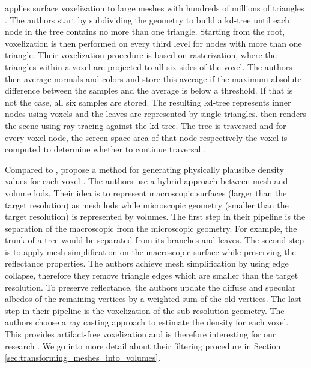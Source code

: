 \citeauthor{afra_voxel_lods} applies surface voxelization to large meshes with hundreds of millions of triangles \cite{afra_voxel_lods}.
The authors start by subdividing the geometry to build a kd-tree until each node in the tree contains no more than one triangle.
Starting from the root, voxelization is then performed on every third level for nodes with more than one triangle.
Their voxelization procedure is based on rasterization, where the triangles within a voxel are projected to all six sides of the voxel.
The authors then average normals and colors and store this average if the maximum absolute difference between the samples and the average is below a threshold.
If that is not the case, all six samples are stored.
The resulting kd-tree represents inner nodes using voxels and the leaves are represented by single triangles.
\citeauthor{afra_voxel_lods} then renders the scene using ray tracing against the kd-tree.
The tree is traversed and for every voxel node, the screen space area of that node respectively the voxel is computed to determine whether to continue traversal \cite{afra_voxel_lods}.

Compared to \citeauthor{afra_voxel_lods}, \citeauthor{hybrid_mesh_volume_lods} propose a method for generating physically plausible density values for each voxel \cite{hybrid_mesh_volume_lods}.
The authors use a hybrid approach between mesh and volume \acp{lod}.
Their idea is to represent macroscopic surfaces (larger than the target resolution) as mesh \acsp{lod} while microscopic geometry (smaller than the target resolution) is represented by volumes.
The first step in their pipeline is the separation of the macroscopic from the microscopic geometry.
For example, the trunk of a tree would be separated from its branches and leaves.
The second step is to apply mesh simplification on the macroscopic surface while preserving the reflectance properties.
The authors achieve mesh simplification by using edge collapse, therefore they remove triangle edges which are smaller than the target resolution.
To preserve reflectance, the authors update the diffuse and specular albedos of the remaining vertices by a weighted sum of the old vertices.
The last step in their pipeline is the voxelization of the sub-resolution geometry.
The authors choose a ray casting approach to estimate the density for each voxel.
This provides artifact-free voxelization and is therefore interesting for our research \cite{hybrid_mesh_volume_lods}.
We go into more detail about their filtering procedure in Section \ref{sec:transforming_meshes_into_volumes}.





